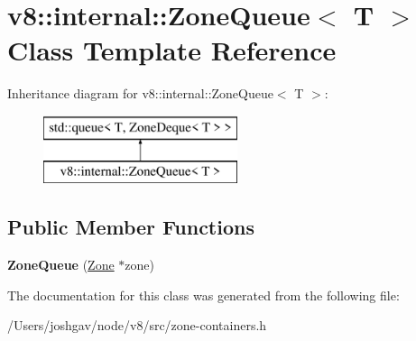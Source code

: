 \hypertarget{classv8_1_1internal_1_1_zone_queue}{}\section{v8\+:\+:internal\+:\+:Zone\+Queue$<$ T $>$ Class Template Reference}
\label{classv8_1_1internal_1_1_zone_queue}
Inheritance diagram for v8\+:\+:internal\+:\+:Zone\+Queue$<$ T $>$\+:\begin{figure}[H]
\begin{center}
\leavevmode
\includegraphics[height=2.000000cm]{classv8_1_1internal_1_1_zone_queue}
\end{center}
\end{figure}
\subsection*{Public Member Functions}
\begin{DoxyCompactItemize}
\item 
{\bfseries Zone\+Queue} (\hyperlink{classv8_1_1internal_1_1_zone}{Zone} $\ast$zone)\hypertarget{classv8_1_1internal_1_1_zone_queue_af8303c6b28e478168cbd7ea65e536bbe}{}\label{classv8_1_1internal_1_1_zone_queue_af8303c6b28e478168cbd7ea65e536bbe}

\end{DoxyCompactItemize}


The documentation for this class was generated from the following file\+:\begin{DoxyCompactItemize}
\item 
/\+Users/joshgav/node/v8/src/zone-\/containers.\+h\end{DoxyCompactItemize}
